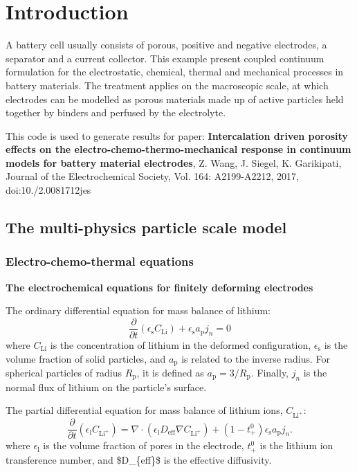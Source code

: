\hypertarget{_intercalation_Introduction}{}\section{Introduction}\label{_intercalation_Introduction}
A battery cell usually consists of porous, positive and negative electrodes, a separator and a current collector. This example present coupled continuum formulation for the electrostatic, chemical, thermal and mechanical processes in battery materials. The treatment applies on the macroscopic scale, at which electrodes can be modelled as porous materials made up of active particles held together by binders and perfused by the electrolyte.

This code is used to generate results for paper\-: {\bfseries Intercalation driven porosity effects on the electro-\/chemo-\/thermo-\/mechanical response in continuum models for battery material electrodes}, Z. Wang, J. Siegel, K. Garikipati, Journal of the Electrochemical Society, Vol. 164\-: A2199-\/\-A2212, 2017, doi\-:10./2.0081712jes  \hypertarget{battery_particle_section1}{}\subsection{The multi-\/physics particle scale model}\label{battery_particle_section1}
\hypertarget{battery_particle_subsub1}{}\subsubsection{Electro-\/chemo-\/thermal equations}\label{battery_particle_subsub1}
{\bfseries The electrochemical equations for finitely deforming electrodes}\par
 The ordinary differential equation for mass balance of lithium\-: \[ \frac{\partial}{\partial t}({\epsilon_\text{s}C_\text{Li}})+\epsilon_\text{s}{a_\text{p}}j_n=0 \] where $C_\text{Li}$ is the concentration of lithium in the deformed configuration, $\epsilon_\text{s}$ is the volume fraction of solid particles, and $a_\text{p}$ is related to the inverse radius. For spherical particles of radius $R_\text{p}$, it is defined as $a_\text{p} = 3/R_\text{p}$. Finally, $j_n$ is the normal flux of lithium on the particle's surface.

The partial differential equation for mass balance of lithium ions, $C_{\text{Li}^+}$\-: \[ \frac{\partial }{\partial t}(\epsilon_\text{l}C_{\text{Li}^+})=\nabla\cdot (\epsilon_\text{l}D_\text{eff}\nabla C_{\text{Li}^+})+(1-t^0_+)\epsilon_\text{s}{a_\text{p}}j_n. \] where $\epsilon_\text{l}$ is the volume fraction of pores in the electrode, $t^0_+$ is the lithium ion transference number, and \$\-D\-\_\-\{eff\}\$ is the effective diffusivity.

